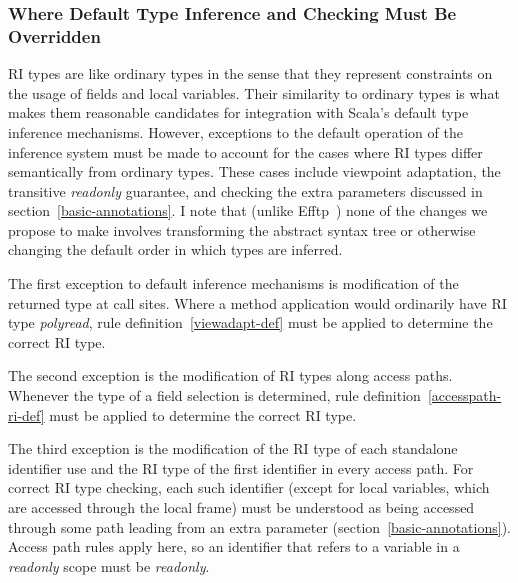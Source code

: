 \documentclass[letterpaper,11pt]{article}
\theoremstyle{definition}
\theoremstyle{remark}
\begin{document}
\subsubsection{Where Default Type Inference and Checking Must Be Overridden}


RI types are like ordinary types in the sense that they represent constraints
on the usage of fields and local variables.
Their similarity to ordinary types is what makes them reasonable candidates for
integration with Scala's default type inference mechanisms.
However, exceptions to the default operation of the inference system must be made
to account for the cases where RI types differ semantically from ordinary types.
These cases include viewpoint adaptation, the transitive \emph{readonly} guarantee, and
checking the extra parameters discussed in section~\ref{basic-annotations}.
I note that (unlike Efftp~\cite{efftp}) none of the changes we propose to make involves
transforming the abstract syntax tree or otherwise changing the default order
in which types are inferred.


The first exception to default inference mechanisms is modification of the returned type
at call sites.
Where a method application would ordinarily have RI type \emph{polyread},
rule definition~\ref{viewadapt-def} must be applied to determine the correct RI type.

The second exception is the modification of RI types along access paths.
Whenever the type of a field selection is determined,
rule definition~\ref{accesspath-ri-def} must be applied to determine the
correct RI type.

The third exception is the modification of the RI type of
each standalone identifier use and
the RI type of the first identifier in every access path.
For correct RI type checking, each such identifier (except for local variables,
which are accessed through the local frame) must be understood as
being accessed through some path leading from an extra parameter (section~\ref{basic-annotations}).
Access path rules apply here, so an identifier that refers to a variable in
a \emph{readonly} scope must be \emph{readonly}.
\end{document}
